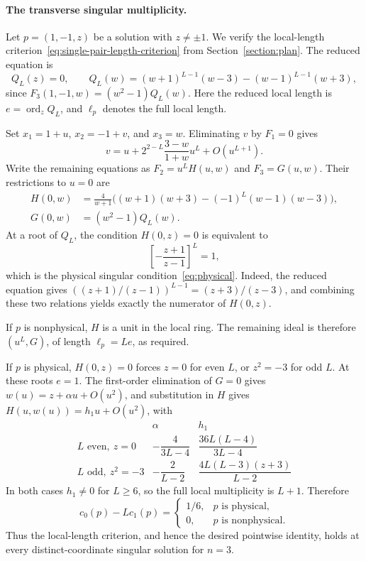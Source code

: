\documentclass[11pt]{article}
\theoremstyle{definition}
\newcommand{\ord}{\operatorname{ord}}
\begin{document}
\paragraph{The transverse singular multiplicity.}
Let $p=(1,-1,z)$ be a solution with $z\ne\pm1$. We verify the
local-length criterion~\eqref{eq:single-pair-length-criterion} from
Section~\ref{section:plan}.
The reduced equation is
\[
 Q_L(z)=0,\qquad
 Q_L(w)=(w+1)^{L-1}(w-3)-(w-1)^{L-1}(w+3),
\]
since $F_3(1,-1,w)=(w^2-1)Q_L(w)$. Here the reduced local length is
$e=\ord_zQ_L$, and $\ell_p$ denotes the full local length.

Set $x_1=1+u$, $x_2=-1+v$, and $x_3=w$. Eliminating $v$ by $F_1=0$
gives
\[
 v=u+2^{2-L}\frac{3-w}{1+w}u^L+O(u^{L+1}).
\]
Write the remaining equations as $F_2=u^LH(u,w)$ and $F_3=G(u,w)$.
Their restrictions to $u=0$ are
\[
 \begin{aligned}
 H(0,w)&=\frac4{w+1}
 \bigl((w+1)(w+3)-(-1)^L(w-1)(w-3)\bigr),\\
 G(0,w)&=(w^2-1)Q_L(w).
 \end{aligned}
\]
At a root of $Q_L$, the condition $H(0,z)=0$ is equivalent to
\[
 \left[-\frac{z+1}{z-1}\right]^L=1,
\]
which is the physical singular condition~\eqref{eq:physical}.
Indeed, the reduced equation gives
$((z+1)/(z-1))^{L-1}=(z+3)/(z-3)$, and combining these two
relations yields exactly the numerator of $H(0,z)$.

If $p$ is nonphysical, $H$ is a unit in the local ring. The remaining
ideal is therefore $(u^L,G)$, of length $\ell_p=Le$, as required.

If $p$ is physical, $H(0,z)=0$ forces $z=0$ for even $L$, or
$z^2=-3$ for odd $L$. At these roots $e=1$. The first-order
elimination of $G=0$ gives $w(u)=z+\alpha u+O(u^2)$, and substitution
in $H$ gives $H(u,w(u))=h_1u+O(u^2)$, with
\[
 \begin{array}{c|c|c}
 &\alpha&h_1\\ \hline
 L\text{ even},\ z=0
 &-\dfrac4{3L-4}&\dfrac{36L(L-4)}{3L-4}\\[6pt]
 L\text{ odd},\ z^2=-3
 &-\dfrac2{L-2}&\dfrac{4L(L-3)(z+3)}{L-2}
 \end{array}
\]
In both cases $h_1\ne0$ for $L\ge6$, so the full local multiplicity
is $L+1$. Therefore
\[
 \boxed{
 c_0(p)-Lc_1(p)
 =\begin{cases}
 1/6,&p\text{ is physical},\\
 0,&p\text{ is nonphysical}.
 \end{cases}}
\]
Thus the local-length criterion, and hence the desired pointwise
identity, holds at every distinct-coordinate singular solution for $n=3$.
\end{document}
